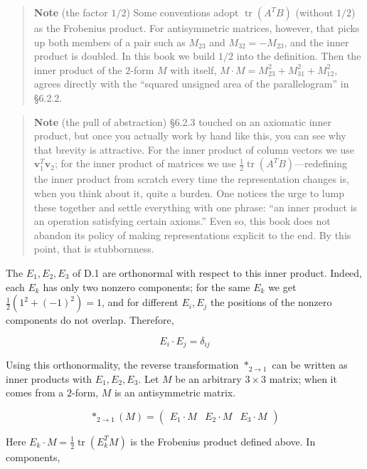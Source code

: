 \begin{quote}
\textbf{Note} (the factor \(1/2\)) Some conventions adopt
\(\operatorname{tr}(A^T B)\) (without \(1/2\)) as the Frobenius product.
For antisymmetric matrices, however, that picks up both members of a
pair such as \(M_{23}\) and \(M_{32}=-M_{23}\), and the inner product is
doubled. In this book we build \(1/2\) into the definition. Then the
inner product of the \(2\)-form \(M\) with itself,
\(M\cdot M=M_{23}^2+M_{31}^2+M_{12}^2\), agrees directly with the
``squared unsigned area of the parallelogram'' in §6.2.2.
\end{quote}

\begin{quote}
\textbf{Note} (the pull of abstraction) §6.2.3 touched on an axiomatic
inner product, but once you actually work by hand like this, you can see
why that brevity is attractive. For the inner product of column vectors
we use \(\mathbf{v}_1^T \mathbf{v}_2\); for the inner product of
matrices we use \(\frac{1}{2}\operatorname{tr}(A^T B)\)---redefining the
inner product from scratch every time the representation changes is,
when you think about it, quite a burden. One notices the urge to lump
these together and settle everything with one phrase: ``an inner product
is an operation satisfying certain axioms.'' Even so, this book does not
abandon its policy of making representations explicit to the end. By
this point, that is stubbornness.
\end{quote}

The \(E_1,E_2,E_3\) of D.1 are orthonormal with respect to this inner
product. Indeed, each \(E_k\) has only two nonzero components; for the
same \(E_k\) we get \(\frac{1}{2}(1^2+(-1)^2)=1\), and for different
\(E_i,E_j\) the positions of the nonzero components do not overlap.
Therefore,

\[
E_i\cdot E_j=\delta_{ij}
\]

Using this orthonormality, the reverse transformation \(\ast_{2\to1}\)
can be written as inner products with \(E_1,E_2,E_3\). Let \(M\) be an
arbitrary \(3\times3\) matrix; when it comes from a \(2\)-form, \(M\) is
an antisymmetric matrix.

\[
\ast_{2\to1}(M)
=
\begin{pmatrix}
E_1\cdot M & E_2\cdot M & E_3\cdot M
\end{pmatrix}
\]

Here \(E_k\cdot M=\frac{1}{2}\operatorname{tr}(E_k^T M)\) is the
Frobenius product defined above. In components,

